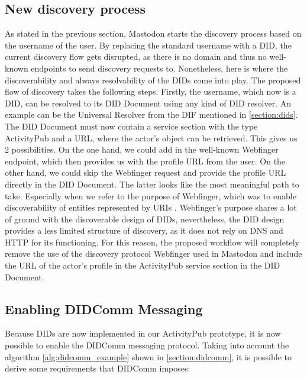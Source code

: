 \subsection{New discovery process}
As stated in the previous section, Mastodon starts the discovery process based on the username of the user. By replacing the standard username with a DID, the current discovery flow gets disrupted, as there is no domain and thus no well-known endpoints to send discovery requests to. Nonetheless, here is where the discoverability and always resolvability of the DIDs come into play. The proposed flow of discovery takes the following steps. Firstly, the username, which now is a DID, can be resolved to its DID Document using any kind of DID resolver. An example can be the Universal Resolver from the DIF mentioned in \autoref{section:dids}. The DID Document must now contain a service section with the type ActivityPub and a URL, where the actor's object can be retrieved. This gives us 2 possibilities. On the one hand, we could add in the well-known Webfinger endpoint, which then provides us with the profile URL from the user. On the other hand, we could skip the Webfinger request and provide the profile URL directly in the DID Document. The latter looks like the most meaningful path to take. Especially when we refer to the purpose of Webfinger, which was to enable discoverability of entities represented by URIs \cite{jones_salgueiro_jones_smarr_2013}. Webfinger's purpose shares a lot of ground with the discoverable design of DIDs, nevertheless, the DID design provides a less limited structure of discovery, as it does not rely on DNS and HTTP for its functioning. For this reason, the proposed workflow will completely remove the use of the discovery protocol Webfinger used in Mastodon and include the URL of the actor's profile in the ActivityPub service section in the DID Document. 

\subsection{Enabling DIDComm Messaging}\label{section:enabling_didcomm}

Because DIDs are now implemented in our ActivityPub prototype, it is now possible to enable the DIDComm messaging protocol. Taking into account the algorithm \ref{alg:didcomm_example} shown in \autoref{section:didcomm}, it is possible to derive some requirements that DIDComm imposes:


